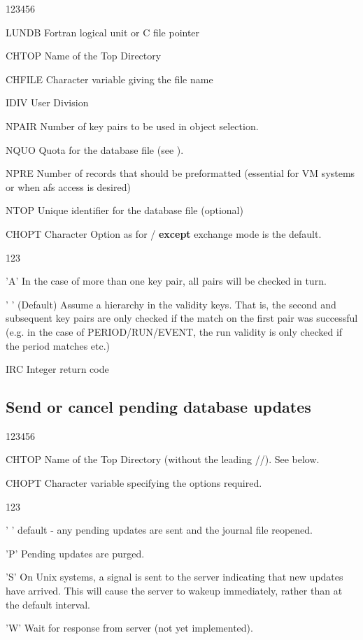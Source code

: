 \begin{DLtt}{123456}
\item[LUNDB]Fortran logical unit or C file pointer
\item[CHTOP]Name of the Top Directory
\item[CHFILE]Character variable giving the file name
\item[IDIV]User Division
\item[NPAIR]Number of key pairs to be used in object selection.
\item[NQUO]Quota for the database file (see ).
\item[NPRE]Number of records that should be preformatted (essential for
VM systems or when afs access is desired)
\item[NTOP]Unique identifier for the database file (optional)
\item[CHOPT]Character Option as for /
  {\bf except} exchange mode is the default.
  \begin{DLtt}{123}
  \item['A']In the case of more than one key pair, all pairs will
          be checked in turn.
  \item[' '](Default) Assume a hierarchy in the validity keys. That is, the second
          and subsequent key pairs are only checked if the match on
          the first pair was successful (e.g. in the case of PERIOD/RUN/EVENT,
          the run validity is only checked if the period matches etc.)
  \end{DLtt}
\item[IRC]Integer return code
\end{DLtt}

\subsection{Send or cancel pending database updates}

\begin{DLtt}{123456}
\item[CHTOP]Name of the Top Directory (without the leading //). See below.
\item[CHOPT]Character variable specifying the options required.
  \begin{DLtt}{123}
    \item[' ']default - any pending updates are sent and the journal file
              reopened.
    \item['P']Pending updates are purged.
    \item['S']On Unix systems, a signal is sent to the server indicating
              that new updates have arrived. This will cause the server
              to wakeup immediately, rather than at the default interval.
    \item['W']Wait for response from server (not yet implemented).
  \end{DLtt}
\end{DLtt}

